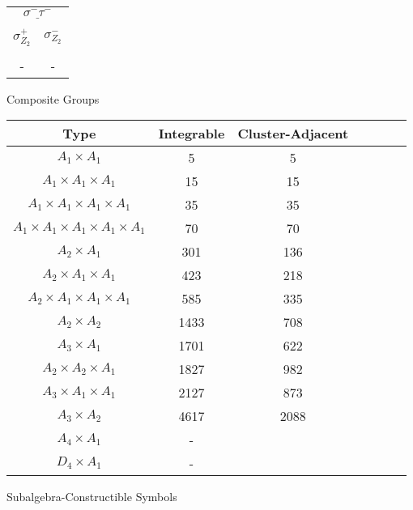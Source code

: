 \documentclass[12pt]{article}
\begin{document}
\begin{center}
\hspace{1.2cm}
\begin{tabular}{| c | c |}
\multicolumn{2}{c}{$\underline{\sigma^- \tau^-}$} \\[-1em]
\multicolumn{1}{c}{} & \multicolumn{1}{c}{} \\
\multicolumn{1}{c}{$\sigma_{Z_2}^+$} & \multicolumn{1}{c}{$\sigma_{Z_2}^-$} \\[-1em]
\multicolumn{1}{c}{} & \multicolumn{1}{c}{} \\
\hline
- & - \\
\hline
\end{tabular} 
\vspace{.6cm}

\newpage
Composite Groups

\begin{tabular}{ | c | c | c | c | c | c |  c |}
\multicolumn{1}{c}{Type} & \multicolumn{1}{c}{Integrable} & \multicolumn{1}{c}{Cluster-Adjacent} \\
\hline \( A_1 \times A_1 \) & 5 & 5  \\ 
\hline \( A_1 \times A_1 \times A_1 \) & 15 & 15  \\ 
\hline \( A_1 \times A_1 \times A_1 \times A_1 \) & 35 & 35  \\ 
\hline \( A_1 \times A_1 \times A_1 \times A_1 \times A_1 \) & 70 & 70  \\ 
\hline \( A_2 \times A_1 \) & 301 & 136  \\ 
\hline \( A_2 \times A_1 \times A_1 \) & 423 & 218  \\ 
\hline \( A_2 \times A_1 \times A_1 \times A_1 \) & 585 & 335  \\ 
\hline \( A_2 \times A_2 \) & 1433 & 708  \\ 
\hline \( A_3 \times A_1 \) & 1701 & 622  \\ 
\hline \( A_2 \times A_2 \times A_1 \) & 1827 & 982  \\ 
\hline \( A_3 \times A_1 \times A_1 \) & 2127 & 873  \\ 
\hline \( A_3 \times A_2 \) & 4617 & 2088  \\ 
\hline \( A_4 \times A_1 \) & - &  \\ 
\hline \( D_4 \times A_1 \) & - &  \\ 
\hline
\end{tabular}
\vspace{.6cm}


\newpage
Subalgebra-Constructible Symbols


\end{center}
\end{document}
